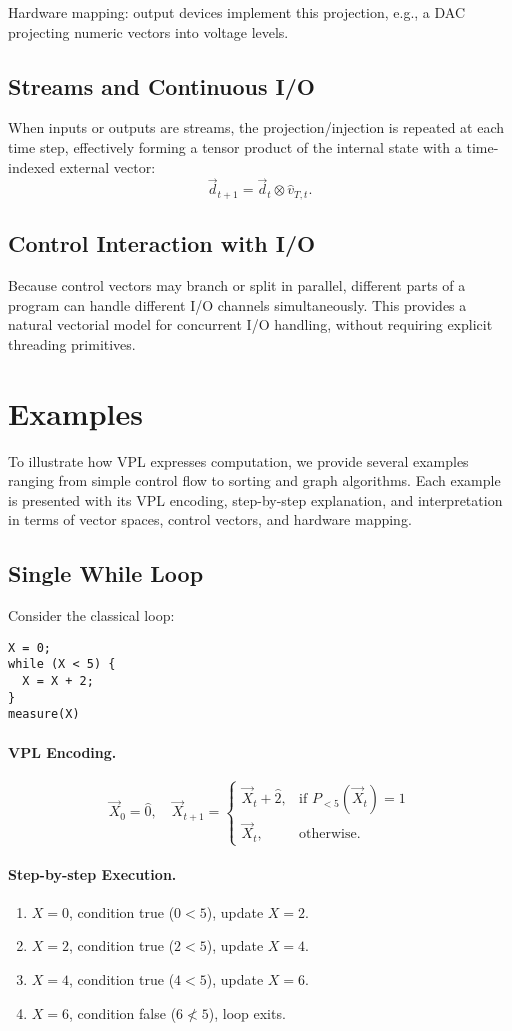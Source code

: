 \documentclass[12pt]{article}
\begin{document}
Hardware mapping: output devices implement this projection, e.g., a DAC
projecting numeric vectors into voltage levels.

\subsection{Streams and Continuous I/O}
When inputs or outputs are streams, the projection/injection is repeated at each
time step, effectively forming a tensor product of the internal state with a
time-indexed external vector:
\[
\vec{d}_{t+1} = \vec{d}_t \otimes \hat{v}_{T,t}.
\]

\subsection{Control Interaction with I/O}
Because control vectors may branch or split in parallel, different parts of a
program can handle different I/O channels simultaneously. This provides a
natural vectorial model for concurrent I/O handling, without requiring explicit
threading primitives.

\section{Examples}
To illustrate how VPL expresses computation, we provide several examples ranging
from simple control flow to sorting and graph algorithms. Each example is
presented with its VPL encoding, step-by-step explanation, and interpretation in
terms of vector spaces, control vectors, and hardware mapping.

\subsection{Single While Loop}
Consider the classical loop:
\begin{verbatim}
X = 0;
while (X < 5) {
  X = X + 2;
}
measure(X)
\end{verbatim}

\paragraph{VPL Encoding.}
\[
\vec{X}_0 = \hat{0}, \quad
\vec{X}_{t+1} =
\begin{cases}
\vec{X}_t + \hat{2}, & \text{if } P_{<5}(\vec{X}_t) = 1 \\
\vec{X}_t, & \text{otherwise.}
\end{cases}
\]

\paragraph{Step-by-step Execution.}
\begin{enumerate}
  \item $X = 0$, condition true ($0 < 5$), update $X = 2$.
  \item $X = 2$, condition true ($2 < 5$), update $X = 4$.
  \item $X = 4$, condition true ($4 < 5$), update $X = 6$.
  \item $X = 6$, condition false ($6 \not< 5$), loop exits.
\end{enumerate}
\end{document}
